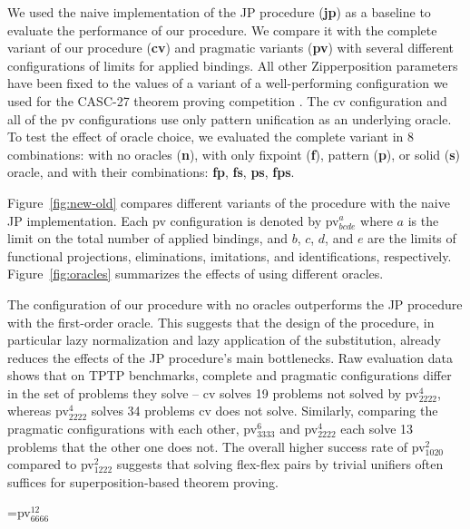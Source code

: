 We used the naive implementation of the JP procedure (\textbf{jp}) as a baseline
to evaluate the performance of our procedure. We compare it with the complete
variant of our procedure (\textbf{cv}) and pragmatic variants
(\textbf{pv}) with several different configurations of limits for
applied bindings. All other Zipperposition parameters have been fixed to the values of
a variant of a well-performing configuration we used for the CASC-27 theorem proving competition \cite{gs-19-casc27}.
The cv configuration and all of the pv
configurations use only pattern unification as an underlying oracle. To test
the effect of oracle choice, we evaluated the complete variant
in 8 combinations: with no oracles
(\textbf{n}), with only fixpoint (\textbf{f}), pattern (\textbf{p}), or solid (\textbf{s}) oracle,
and with their combinations: \textbf{fp}, \textbf{fs}, \textbf{ps}, \textbf{fps}.

Figure~\ref{fig:new-old} compares different variants of the procedure with the
naive JP implementation. Each pv configuration is denoted by pv$^{a}_{bcde}$
where $a$ is the limit on the total number of applied bindings, and $b$, $c$,
$d$, and $e$ are the limits of functional projections, eliminations, imitations,
and identifications, respectively. Figure~\ref{fig:oracles} summarizes the
effects of using different oracles.

The configuration of our procedure with no oracles outperforms the JP procedure with the first-order oracle. This
suggests that the design of the procedure, in particular lazy normalization and
lazy application of the substitution, already reduces the effects of the JP
procedure's main bottlenecks. Raw evaluation data shows that on TPTP benchmarks, complete and pragmatic configurations
differ in the set of problems they solve -- cv solves 19
problems not solved by pv$^{4}_{2222}$, whereas pv$^{4}_{2222}$ solves 34
problems cv does not solve. Similarly, comparing the pragmatic configurations with each other,
pv$^{6}_{3333}$ and pv$^{4}_{2222}$ each solve 13 problems that the other one does not.  The overall higher success rate of pv$^2_{1020}$ compared to
pv$^2_{1222}$ suggests that solving flex-flex pairs by trivial unifiers often
suffices for superposition-based theorem proving. 

\newbox\mybox
\setbox\mybox=\hbox{\small pv$^{12}_{6666}$}

\newcommand\HEAD[1]{\hbox to \wd\mybox{\hfill\hbox{#1}\hfill}}
\newcommand\Z{\phantom{0}}
\newcommand\MIDLINE{\\[.25ex]\hline\rule{0pt}{3ex}}

